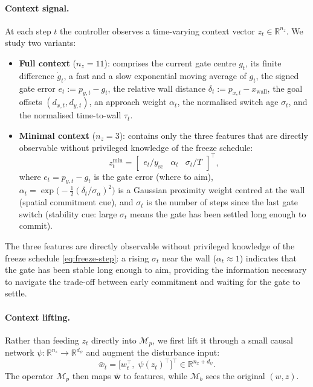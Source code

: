 \documentclass[journal,twoside,web]{ieeecolor}
\begin{document}
\paragraph{Context signal.}
At each step \(t\) the controller observes a time-varying context vector \(z_t\in\mathbb{R}^{n_z}\).
We study two variants:
\begin{itemize}
  \item \textbf{Full context} (\(n_z=11\)): comprises the current gate centre \(g_t\), its finite
    difference \(\dot g_t\), a fast and a slow exponential moving average of \(g_t\), the
    signed gate error \(e_t:=p_{y,t}-g_t\), the relative wall distance
    \(\delta_t:=p_{x,t}-x_{\mathrm{wall}}\), the goal offsets \((d_{x,t},d_{y,t})\), an
    approach weight \(\alpha_t\), the normalised switch age \(\sigma_t\), and the
    normalised time-to-wall \(\tau_t\).

  \item \textbf{Minimal context} (\(n_z=3\)): contains only the three features that are
    directly observable without privileged knowledge of the freeze schedule:
    \begin{equation}
      z_t^{\min}
      =
      \begin{bmatrix}
        e_t/y_{\mathrm{sc}} & \alpha_t & \sigma_t/T
      \end{bmatrix}^\top,
      \label{eq:minimal-context}
    \end{equation}
    where \(e_t = p_{y,t}-g_t\) is the gate error (where to aim),
    \(\alpha_t = \exp\!\bigl(-\tfrac{1}{2}(\delta_t/\sigma_{\alpha})^2\bigr)\) is a
    Gaussian proximity weight centred at the wall (spatial commitment cue), and
    \(\sigma_t\) is the number of steps since the last gate switch (stability cue:
    large \(\sigma_t\) means the gate has been settled long enough to commit).
\end{itemize}
The three features are directly observable without privileged knowledge of the freeze
schedule \eqref{eq:freeze-step}: a rising \(\sigma_t\) near the wall
(\(\alpha_t\approx 1\)) indicates that the gate has been stable long enough to aim,
providing the information necessary to navigate the trade-off between early commitment
and waiting for the gate to settle.

\paragraph{Context lifting.}
Rather than feeding \(z_t\) directly into \(\mathcal{M}_p\), we first lift it through a
small causal network \(\psi:\mathbb{R}^{n_z}\to\mathbb{R}^{d_\psi}\) and augment the
disturbance input:
\begin{equation}
\bar{w}_t = \bigl[w_t^\top,\;\psi(z_t)^\top\bigr]^\top \in \mathbb{R}^{n_x+d_\psi}.
\label{eq:lifting}
\end{equation}
The operator \(\mathcal{M}_p\) then maps \(\bar{\mathbf{w}}\) to features, while
\(\mathcal{M}_b\) sees the original \((w,z)\).
\end{document}
